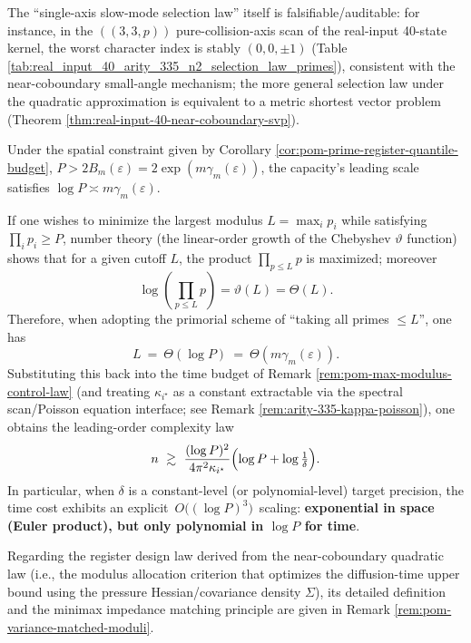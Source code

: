 \begin{remark}
\par
The ``single-axis slow-mode selection law'' itself is falsifiable/auditable: for instance, in the \(((3,3,p))\) pure-collision-axis scan of the real-input 40-state kernel, the worst character index is stably \((0,0,\pm1)\) (Table \ref{tab:real_input_40_arity_335_n2_selection_law_primes}), consistent with the near-coboundary small-angle mechanism; the more general selection law under the quadratic approximation is equivalent to a metric shortest vector problem (Theorem \ref{thm:real-input-40-near-coboundary-svp}).
\end{remark}

\begin{remark}\label{rem:pom-primorial-polylog-time}
Under the spatial constraint given by Corollary \ref{cor:pom-prime-register-quantile-budget},
\(
P>2B_m(\varepsilon)=2\exp(m\gamma_m(\varepsilon))
\),
the capacity's leading scale satisfies \(\log P\asymp m\gamma_m(\varepsilon)\).
\par
If one wishes to minimize the largest modulus \(L=\max_i p_i\) while satisfying \(\prod_i p_i\ge P\), number theory (the linear-order growth of the Chebyshev \(\vartheta\) function) shows that for a given cutoff \(L\), the product \(\prod_{p\le L}p\) is maximized; moreover
\[
\log\!\left(\prod_{p\le L}p\right)=\vartheta(L)=\Theta(L).
\]
Therefore, when adopting the primorial scheme of ``taking all primes \(\le L\)'', one has
\[
L\ =\ \Theta(\log P)\ =\ \Theta(m\gamma_m(\varepsilon)).
\]
Substituting this back into the time budget of Remark \ref{rem:pom-max-modulus-control-law} (and treating \(\kappa_{i^\star}\) as a constant extractable via the spectral scan/Poisson equation interface; see Remark \ref{rem:arity-335-kappa-poisson}), one obtains the leading-order complexity law
\[
n\ \gtrsim\ \frac{(\log P)^2}{4\pi^2\kappa_{i^\star}}\Bigl(\log P+\log\tfrac{1}{\delta}\Bigr).
\]
In particular, when \(\delta\) is a constant-level (or polynomial-level) target precision, the time cost exhibits an explicit \(\,O\big((\log P)^3\big)\,\) scaling: \textbf{exponential in space (Euler product), but only polynomial in \(\log P\) for time}.
\end{remark}

\begin{remark}
Regarding the register design law derived from the near-coboundary quadratic law (i.e., the modulus allocation criterion that optimizes the diffusion-time upper bound using the pressure Hessian/covariance density $\Sigma$), its detailed definition and the minimax impedance matching principle are given in Remark \ref{rem:pom-variance-matched-moduli}.
\end{remark}

